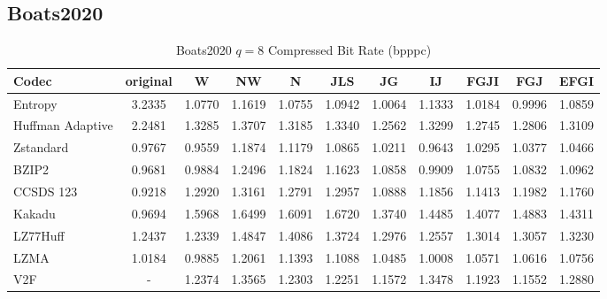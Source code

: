 \documentclass{article}
\begin{document}
\subsection{Boats2020}
\begin{table}[h!]
\centering
\caption{Boats2020 $q=8$ Compressed Bit Rate (bpppc)}
\begin{tabular}{|l|cccccccccc|}
\hline
Codec &  original &      W &     NW &      N &    JLS &     JG &     IJ &   FGJI &    FGJ &   EFGI \\
\hline
Entropy & 3.2335 & 1.0770 & 1.1619 & 1.0755 & 1.0942 & 1.0064 & 1.1333 & 1.0184 & 0.9996 & 1.0859 \\
\hline
Huffman Adaptive &    2.2481 & 1.3285 & 1.3707 & 1.3185 & 1.3340 & 1.2562 & 1.3299 & 1.2745 & 1.2806 & 1.3109 \\
Zstandard        &    0.9767 & 0.9559 & 1.1874 & 1.1179 & 1.0865 & 1.0211 & 0.9643 & 1.0295 & 1.0377 & 1.0466 \\
BZIP2            &    0.9681 & 0.9884 & 1.2496 & 1.1824 & 1.1623 & 1.0858 & 0.9909 & 1.0755 & 1.0832 & 1.0962 \\
CCSDS 123        &    0.9218 & 1.2920 & 1.3161 & 1.2791 & 1.2957 & 1.0888 & 1.1856 & 1.1413 & 1.1982 & 1.1760 \\
Kakadu           &    0.9694 & 1.5968 & 1.6499 & 1.6091 & 1.6720 & 1.3740 & 1.4485 & 1.4077 & 1.4883 & 1.4311 \\
LZ77Huff         &    1.2437 & 1.2339 & 1.4847 & 1.4086 & 1.3724 & 1.2976 & 1.2557 & 1.3014 & 1.3057 & 1.3230 \\
LZMA             &    1.0184 & 0.9885 & 1.2061 & 1.1393 & 1.1088 & 1.0485 & 1.0008 & 1.0571 & 1.0616 & 1.0756 \\
V2F              &   - & 1.2374 & 1.3565 & 1.2303 & 1.2251 & 1.1572 & 1.3478 & 1.1923 & 1.1552 & 1.2880 \\
\hline
\end{tabular}
\end{table}
\end{document}
